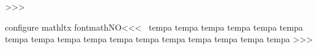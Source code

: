 {{%
>>>


\<configure mathltx fontmathNO\><<<
\def\:tempa#1{%
   \def\:temp{\HCode{\string\firstOfOne}\,\HCode{\string#1\space}}%
   \HLet#1\:temp }
\:tempa\bigcap
\:tempa\bigcirc
\:tempa\bigcup
\:tempa\bigodot
\:tempa\bigoplus
\:tempa\bigotimes
\:tempa\bigsqcup
\:tempa\bigtriangledown
\:tempa\bigtriangleup
\:tempa\biguplus
\:tempa\bigvee
\:tempa\bigwedge
\:tempa\coprod
\:tempa\int
\:tempa\intop
\:tempa\ointop
\:tempa\prod
\:tempa\sum
>>>





}}
